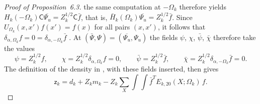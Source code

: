 \documentclass[11pt,letterpaper,reqno]{amsart}
\theoremstyle{definition}
\begin{document}
\begin{proof}[Proof of Proposition~6.3]
the same computation at $-\Omega_k$ therefore yields $H_k(-\Omega_k)\mathsf C\overline{\Psi_u}=\allowbreak Z_k^{1/2}\mathsf C\bar f$, that is, $\bar H_k(\Omega_k)\overline{\Psi_u}=Z_k^{1/2}\bar f$.
Since $U_{\Omega_k}(x,x')f(x')=f(x)$ for all pairs $(x,x')$, it follows that $\delta_{\alpha,\Omega_k}f=0=\delta_{\alpha,-\Omega_k}\bar f$ \cite[(I.1.6), (I.1.7)]{QEDIII}.
At $(\bar\Psi,\Psi)=(\overline{\Psi_u},\Psi_u)$ the fields $\psi$, $\chi$, $\bar\psi$, $\bar\chi$ therefore take the values
\begin{equation*}
\psi=Z_k^{1/2}f,\qquad\chi=Z_k^{1/2}\delta_{\alpha,\Omega_k}f=0,\qquad\bar\psi=Z_k^{1/2}\bar f,\qquad\bar\chi=Z_k^{1/2}\delta_{\alpha,-\Omega_k}\bar f=0.
\end{equation*}
The definition of the density in \cite[Section~I.5.7, paragraph ``The density and the block transformation'']{QEDIII}, with these fields inserted, then gives
\begin{equation*}
\mathsf z_k=d_k+Z_km_k-Z_k\sum_X\int\!\!\int\bar f^{T}E_{k,20}(X;\Omega_k)\,f .
\end{equation*}


\end{proof}
\end{document}
